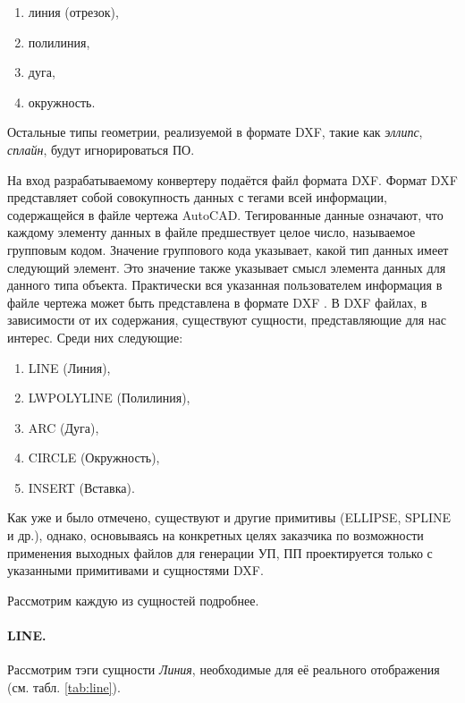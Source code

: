 \begin{enumerate}
	\item линия (отрезок),
	\item полилиния,
	\item дуга,
	\item окружность.
\end{enumerate}

Остальные типы геометрии, реализуемой в формате DXF, такие как \textit{эллипс}, \textit{сплайн}, будут игнорироваться ПО.

На вход разрабатываемому конвертеру подаётся файл формата DXF. Формат DXF представляет собой совокупность данных с тегами всей информации, содержащейся в файле чертежа AutoCAD. Тегированные данные означают, что каждому элементу данных в файле предшествует целое число, называемое групповым кодом. Значение группового кода указывает, какой тип данных имеет следующий элемент. Это значение также указывает смысл элемента данных для данного типа объекта. Практически вся указанная пользователем информация в файле чертежа может быть представлена в формате DXF \cite{autocad2012dxf}.
В DXF файлах, в зависимости от их содержания, существуют сущности, представляющие для нас интерес. Среди них следующие:

\begin{enumerate}
	\item LINE (Линия),
	\item LWPOLYLINE (Полилиния),
	\item ARC (Дуга),
	\item CIRCLE (Окружность),
	\item INSERT (Вставка).
\end{enumerate}

Как уже и было отмечено, существуют и другие примитивы (ELLIPSE, SPLINE и др.), однако, основываясь на конкретных целях заказчика по возможности применения выходных файлов для генерации УП, ПП проектируется только с указанными примитивами и сущностями DXF.

Рассмотрим каждую из сущностей подробнее.

\paragraph{LINE.} Рассмотрим тэги сущности \textit{Линия}, необходимые для её реального отображения (см. табл. \ref{tab:line}).


